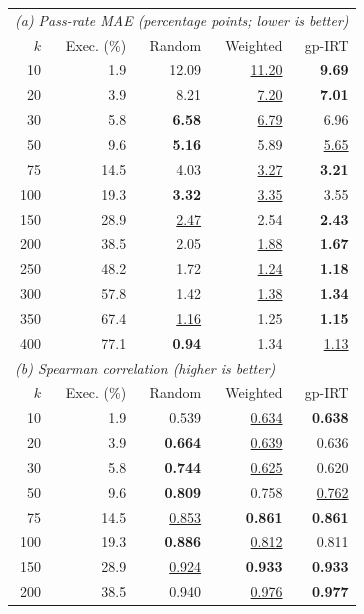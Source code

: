 \begin{table}[t]
  \centering
  \small
  \setlength{\tabcolsep}{3.5pt}
  \begin{tabular}{rrrrr}
    \toprule
    \multicolumn{5}{l}{\textit{(a) Pass-rate MAE (percentage points; lower is better)}} \\
    $k$ & Exec. (\%) & Random & Weighted & gp-IRT \\
    \midrule
    10 & 1.9 & 12.09 & \underline{11.20} & \textbf{9.69} \\
    20 & 3.9 & 8.21 & \underline{7.20} & \textbf{7.01} \\
    30 & 5.8 & \textbf{6.58} & \underline{6.79} & 6.96 \\
    50 & 9.6 & \textbf{5.16} & 5.89 & \underline{5.65} \\
    75 & 14.5 & 4.03 & \underline{3.27} & \textbf{3.21} \\
    100 & 19.3 & \textbf{3.32} & \underline{3.35} & 3.55 \\
    150 & 28.9 & \underline{2.47} & 2.54 & \textbf{2.43} \\
    200 & 38.5 & 2.05 & \underline{1.88} & \textbf{1.67} \\
    250 & 48.2 & 1.72 & \underline{1.24} & \textbf{1.18} \\
    300 & 57.8 & 1.42 & \underline{1.38} & \textbf{1.34} \\
    350 & 67.4 & \underline{1.16} & 1.25 & \textbf{1.15} \\
    400 & 77.1 & \textbf{0.94} & 1.34 & \underline{1.13} \\
    \midrule
    \multicolumn{5}{l}{\textit{(b) Spearman correlation (higher is better)}} \\
    $k$ & Exec. (\%) & Random & Weighted & gp-IRT \\
    \midrule
    10 & 1.9 & 0.539 & \underline{0.634} & \textbf{0.638} \\
    20 & 3.9 & \textbf{0.664} & \underline{0.639} & 0.636 \\
    30 & 5.8 & \textbf{0.744} & \underline{0.625} & 0.620 \\
    50 & 9.6 & \textbf{0.809} & 0.758 & \underline{0.762} \\
    75 & 14.5 & \underline{0.853} & \textbf{0.861} & \textbf{0.861} \\
    100 & 19.3 & \textbf{0.886} & \underline{0.812} & 0.811 \\
    150 & 28.9 & \underline{0.924} & \textbf{0.933} & \textbf{0.933} \\
    200 & 38.5 & 0.940 & \underline{0.976} & \textbf{0.977} \\

\end{tabular}
\end{table}
